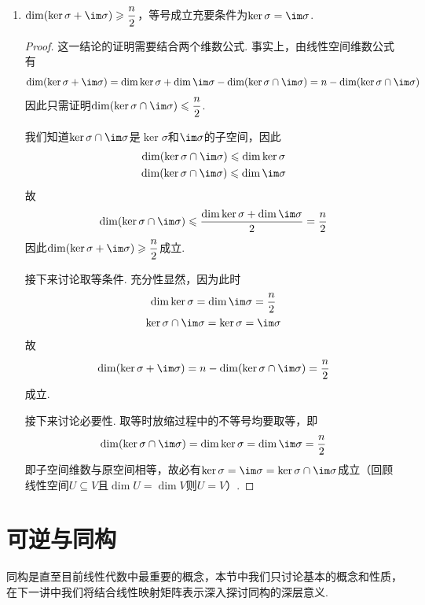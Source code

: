 \begin{enumerate}
    \item $\dim(\ker\sigma+\im \sigma) \geqslant \dfrac{n}{2}$，等号成立充要条件为$\ker\sigma=\im \sigma$.

          \begin{proof}
              这一结论的证明需要结合两个维数公式. 事实上，由线性空间维数公式有
              \[\dim(\ker\sigma+\im \sigma)=\dim\ker\sigma+\dim\im \sigma-\dim(\ker\sigma \cap \im \sigma)=n-\dim(\ker\sigma \cap \im \sigma)\]
              因此只需证明$\dim(\ker\sigma \cap \im \sigma) \leqslant \dfrac{n}{2}$.

              我们知道$\ker\sigma\cap \im \sigma$是$\ker\sigma$和$\im\sigma$的子空间，因此
              \begin{gather*}
                  \dim(\ker\sigma\cap \im \sigma) \leqslant \dim\ker\sigma \\
                  \dim(\ker\sigma\cap \im \sigma) \leqslant \dim\im\sigma
              \end{gather*}
              故
              \[\dim(\ker\sigma\cap \im \sigma) \leqslant \dfrac{\dim\ker\sigma + \dim\im \sigma}{2}=\dfrac{n}{2}\]
              因此$\dim(\ker\sigma+\im \sigma) \geqslant \dfrac{n}{2}$成立.

              接下来讨论取等条件. 充分性显然，因为此时
              \begin{gather*}
                  \dim\ker\sigma=\dim\im\sigma=\dfrac{n}{2} \\
                  \ker\sigma\cap \im \sigma=\ker\sigma=\im\sigma
              \end{gather*}
              故
              \[\dim(\ker\sigma+\im \sigma)=n-\dim(\ker\sigma \cap \im \sigma)=\dfrac{n}{2}\]
              成立.

              接下来讨论必要性. 取等时放缩过程中的不等号均要取等，即
              \[\dim(\ker\sigma\cap \im \sigma) = \dim\ker\sigma = \dim\im \sigma = \dfrac{n}{2}\]
              即子空间维数与原空间相等，故必有$\ker\sigma=\im \sigma=\ker\sigma\cap \im \sigma$成立（回顾线性空间$U\subseteq V$且$\dim U=\dim V$则$U=V$）.
          \end{proof}
\end{enumerate}

\section{可逆与同构}

同构是直至目前线性代数中最重要的概念，本节中我们只讨论基本的概念和性质，在下一讲中我们将结合线性映射矩阵表示深入探讨同构的深层意义.

